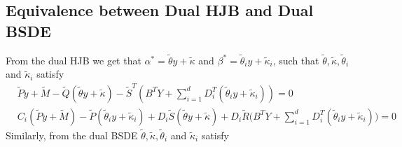 \subsection{Equivalence between Dual HJB and Dual BSDE}
From the dual HJB we get that $\alpha^\ast = \tilde{\theta}y + \tilde{\kappa}$ and $\beta^\ast = \tilde{\theta}_i y + \tilde{\kappa}_i$, such that $\tilde{\theta}, \tilde{\kappa}, \tilde{\theta}_i$ and $\tilde{\kappa}_i$ satisfy 
\begin{align*}
    &\tilde{P}y + \tilde{M} - \tilde{Q}(\tilde{\theta}y + \tilde{\kappa}) - \tilde{S}^T (B^T Y + \sum_{i=1}^d D_i^T (\tilde{\theta}_i y + \tilde{\kappa}_i)) = 0\\
    &C_i (\tilde{P}y + \tilde{M}) - \tilde{P} (\tilde{\theta}_i y + \tilde{\kappa}_i)
    + D_i \tilde{S}(\tilde{\theta}y + \tilde{\kappa}) + D_i\tilde{R}\bigg(B^T Y + \sum_{i=1}^d D_i^T (\tilde{\theta}_i y + \tilde{\kappa}_i)\bigg) = 0
\end{align*}
Similarly, from the dual BSDE $\tilde{\theta}, \tilde{\kappa}, \tilde{\theta}_i$ and $\tilde{\kappa}_i$ satisfy 

